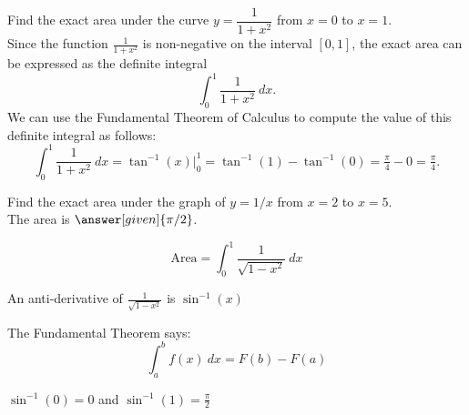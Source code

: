 \documentclass{ximera}
\begin{document}
\begin{example} %
Find the exact area under the curve $y = \dfrac{1}{1+x^2}$ from $x=0$ to $x= 1$.\\
Since the function $\frac{1}{1+x^2}$ is non-negative on the interval $[0, 1]$, the exact area can be expressed as the definite integral
\[\int_0^{1} \frac{1}{1+x^2} \ dx.\]
We can use the Fundamental Theorem of Calculus to compute the value of this definite integral as follows:
\[
\int_0^{1} \frac{1}{1+x^2} \ dx = \tan^{-1}(x) \Big|_0^1 
= \tan^{-1}(1)- \tan^{-1}(0) = \tfrac{\pi}{4}-0 =\tfrac{\pi}{4}.
\]


\begin{image}
\end{image}


\end{example}

\begin{problem} %
Find the exact area under the graph of $y = 1/x$ from $x = 2$ to $x = 5$.\\
The area is $\answer[given]{\pi/2}$.
 \begin{hint}
  \[
  \text{Area} =  \int_0^1 \frac{1}{\sqrt{1-x^2}} \ dx
  \]
 \end{hint} 
    \begin{hint}
      An anti-derivative of $\frac{1}{\sqrt{1-x^2}}$ is $\sin^{-1}(x)$
    \end{hint}
    
    \begin{hint}
      The Fundamental Theorem says:
      \[
      \int_a^b f(x) \ dx = F(b) - F(a)
      \]
    \end{hint}    
		\begin{hint}
      $\sin^{-1}(0) = 0$ and $\sin^{-1}(1) = \frac{\pi}{2}$ 
    \end{hint}
		
		
\end{problem}
\end{document}
